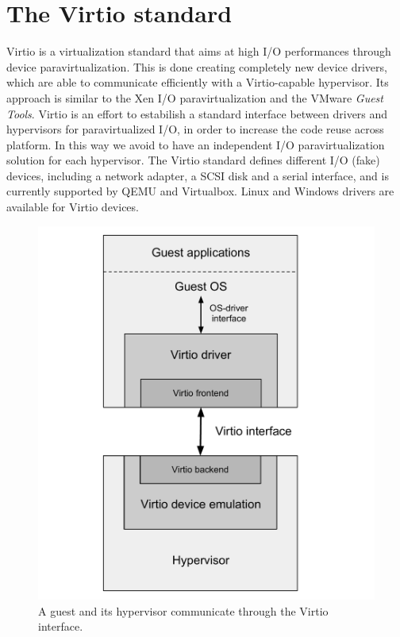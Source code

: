 \section{The Virtio standard}
Virtio is a virtualization standard that aims at high I/O performances through device paravirtualization. This is done creating completely
new device drivers, which are able to communicate efficiently with a Virtio-capable hypervisor. Its approach is
similar to the Xen I/O paravirtualization and the VMware \emph{Guest Tools}.
Virtio is an effort to estabilish a standard interface between drivers and hypervisors for paravirtualized I/O, in order to increase the 
code reuse across platform. In this way we avoid to have an independent I/O paravirtualization solution for each hypervisor.
The Virtio standard defines different I/O (fake) devices, including a network adapter, a SCSI disk and a serial interface, and is currently
supported by QEMU and Virtualbox. Linux and Windows drivers are available for Virtio devices.

\begin{figure}[bt]
\centering
\includegraphics[scale = 0.45]{virtio.pdf}
\caption{A guest and its hypervisor communicate through the Virtio interface.}
\label{fig:virtio}
\end{figure}


